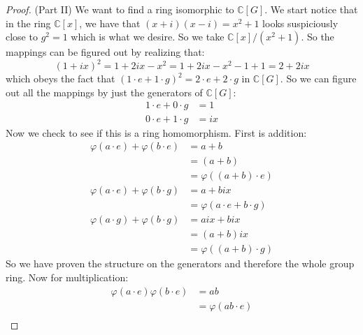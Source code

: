 \documentclass{article}
\begin{document}
\begin{proof}
        (Part II) We want to find a ring isomorphic to $\mathbb{C}[G]$. We start notice that in the ring $\mathbb{C}[x]$, we have that $(x + i)(x - i) = x^{2} + 1$ looks suspiciously close to $g^{2} = 1$ which is what we desire. So we take $\mathbb{C}[x]/(x^{2} + 1)$. So the mappings can be figured out by realizing that:
            \begin{equation*}
                (1 + ix)^{2} = 1 + 2ix - x^{2} = 1 + 2ix - x^{2} - 1 + 1 = 2 + 2ix
            \end{equation*}
        which obeys the fact that $(1 \cdot e + 1 \cdot g)^{2} = 2 \cdot e + 2 \cdot g$ in $\mathbb{C}[G]$. So we can figure out all the mappings by just the generators of $\mathbb{C}[G]$:
            \begin{align*}
                1 \cdot e + 0 \cdot g &= 1  \\
                0 \cdot e + 1 \cdot g &= ix   
            \end{align*}
        Now we check to see if this is a ring homomorphism. First is addition:
            \begin{align*}
                \varphi(a \cdot e) + \varphi(b \cdot e) &= a + b                          \\
                                                        &= (a + b)                        \\
                                                        &= \varphi((a + b) \cdot e)       \\
                \varphi(a \cdot e) + \varphi(b \cdot g) &= a + bix                        \\
                                                        &= \varphi(a \cdot e + b \cdot g) \\
                \varphi(a \cdot g) + \varphi(b \cdot g) &= aix + bix                      \\
                                                        &= (a + b)ix                      \\
                                                        &= \varphi((a + b) \cdot g)         
            \end{align*}
        So we have proven the structure on the generators and therefore the whole group ring. Now for multiplication:
            \begin{align*}
                \varphi(a \cdot e)\varphi(b \cdot e) &= ab                  \\
                                                     &= \varphi(ab \cdot e) \\

\end{align*}
\end{proof}
\end{document}
